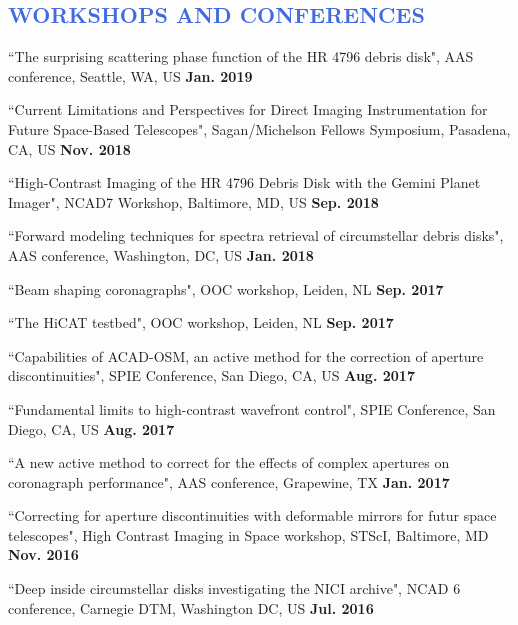 \documentclass[12pt]{article}
\begin{document}
\vspace{-0.8cm}
\textcolor{RoyalBlue}{\subsection{WORKSHOPS AND CONFERENCES}}

\begin{etaremune}
\item ``The surprising scattering phase function of the HR 4796 debris disk", AAS conference, Seattle, WA, US \textbf{Jan. 2019}

\item ``Current Limitations and Perspectives for Direct Imaging Instrumentation for Future Space-Based Telescopes", Sagan/Michelson Fellows Symposium, Pasadena, CA, US \textbf{Nov. 2018}

\item ``High-Contrast Imaging of the HR 4796 Debris Disk with the Gemini Planet Imager", NCAD7 Workshop, Baltimore, MD, US \textbf{Sep. 2018}

\item ``Forward modeling techniques for spectra retrieval of circumstellar debris disks", AAS conference, Washington, DC, US \textbf{Jan. 2018}

\item ``Beam shaping coronagraphs", OOC workshop, Leiden, NL \textbf{Sep. 2017}

\item ``The HiCAT testbed", OOC workshop, Leiden, NL \textbf{Sep. 2017}

\item ``Capabilities of ACAD-OSM, an active method for the correction of aperture discontinuities", SPIE Conference, San Diego, CA, US \textbf{Aug. 2017}

\item ``Fundamental limits to high-contrast wavefront control", SPIE Conference, San Diego, CA, US \textbf{Aug. 2017}

\item ``A new active method to correct for the effects of complex apertures on coronagraph performance", AAS conference, Grapewine, TX \textbf{Jan. 2017}

\item ``Correcting for aperture discontinuities with deformable mirrors for futur space telescopes", High Contrast Imaging in Space workshop, STScI, Baltimore, MD \textbf{Nov. 2016}

\item ``Deep inside circumstellar disks investigating the NICI archive", NCAD 6 conference, Carnegie DTM, Washington DC, US \textbf{Jul. 2016}


\end{etaremune}
\end{document}
